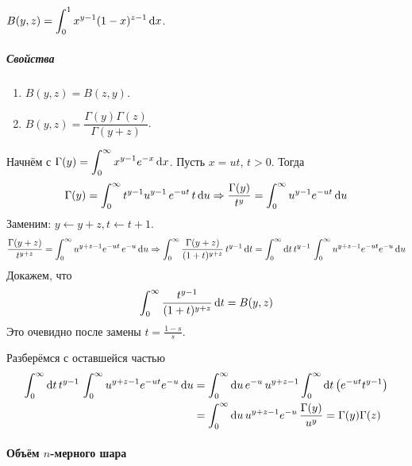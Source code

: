 \documentclass[draft, timbord]{longnotes}
\begin{document}
\begin{defn}\label{defn:meas::beta}
  $\displaystyle B(y,z) = \int_0^1 x^{y-1} (1-x)^{z-1} \, \mathrm{d} x$.
\end{defn}

\subparagraph{Свойства}
\begin{enumerate}[$1^\circ$]
  \item $B(y,z) = B(z,y)$.
  \item $B(y,z) = \dfrac{\Gamma(y) \Gamma(z)}{\Gamma(y+z)}$.
\end{enumerate}

\begin{lproof}
  Начнём с $\Gamma(y) = \displaystyle\int_0^\infty x^{y-1} e^{-x} \, \mathrm{d} x$. Пусть $x=ut$, $t>0$. 
  Тогда
  \[
    \Gamma(y) = \int_0^\infty t^{y-1} u^{y-1} \, e^{-ut} \, t \, \mathrm{d} u 
    \Rightarrow 
    \frac{\Gamma(y)}{t^y} = \int_0^\infty u^{y-1} e^{-ut} \, \mathrm{d} u
  \]
  Заменим: $y \gets y+z, t \gets t+1$.
  \[
    \frac{\Gamma(y+z)}{t^{y+z}} = \int_0^\infty u^{y+z-1} e^{-ut}\, e^{-u}\, \mathrm{d} u
    \Rightarrow 
    \int_0^\infty \frac{\Gamma(y+z)}{(1+t)^{y+z}} \, t^{y-1} \, \mathrm{d} t 
    = \int_0^\infty \mathrm{d} t\, t^{y-1} \, \int_0^\infty u^{y+z-1} e^{-ut} e^{-u} \, \mathrm{d} u
  \]
  Докажем, что
  \[
    \int_0^\infty \frac{t^{y-1}}{(1+t)^{y+z}} \, \mathrm{d} t = B(y,z)
  \]
  Это очевидно после замены $t = \frac{1-s}{s} $.

  Разберёмся с оставшейся частью
  \[
    \begin{split}
      \int_0^\infty \mathrm{d} t\, t^{y-1} \, \int_0^\infty u^{y+z-1} e^{-ut} e^{-u} \, \mathrm{d} u
      &= \int_0^\infty\mathrm{d} u\, e^{-u}\,u^{y+z-1}\int_0^\infty\mathrm{d} t\left(e^{-ut} t^{y-1}\right) \\
      &= \int_0^\infty \mathrm{d} u \, u^{y+z-1} e^{-u} \, \frac{\Gamma(y)}{u^y} 
      = \Gamma(y) \Gamma (z)
    \end{split}
  \]
\end{lproof}

\paragraph{Объём \texorpdfstring{$n$}{n}-мерного шара}
\label{par:meas::ball}
\end{document}
